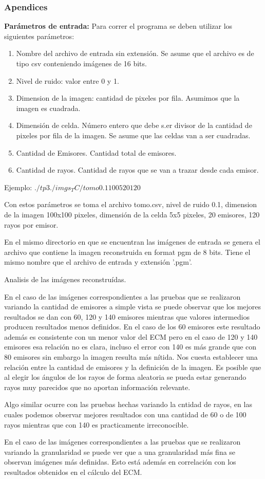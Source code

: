 \subsubsection*{Apendices}

\textbf{Parámetros de entrada:} Para correr el programa se deben utilizar los siguientes parámetros:
\begin{enumerate}
\item Nombre del archivo de entrada sin extensión. Se asume que el archivo es de tipo csv conteniendo imágenes de 16 bits.
\item Nivel de ruido: valor entre 0 y 1.
\item Dimension de la imagen: cantidad de pixeles por fila. Asumimos que la imagen es cuadrada.
\item Dimensión de celda. Número entero que debe s.er divisor de la cantidad de pixeles por fila de la imagen. Se asume que las celdas van a ser cuadradas.
\item Cantidad de Emisores. Cantidad total de emisores.
\item Cantidad de rayos. Cantidad de rayos que se van a trazar desde cada emisor.
\end{enumerate}
\par Ejemplo: $./tp3 ./imgs_TC/tomo 0.1 100 5 20 120$
\par Con estos parámetros se toma el archivo tomo.csv, nivel de ruido 0.1, dimension de la imagen 100x100 pixeles, dimensión de la celda 5x5 pixeles, 20 emisores, 120 rayos por emisor.

\par En el mismo directorio en que se encuentran las imágenes de entrada se genera el archivo que contiene la imagen reconstruida en format pgm de 8 bits. Tiene el mismo nombre que el archivo de entrada y extensión '.pgm'.

Analisis de las imágenes reconstruídas.

En el caso de las imágenes correspondientes a las pruebas que se realizaron variando la cantidad de emisores a simple vista se puede observar que los mejores resultados se dan con 60, 120 y 140 emisores mientras que valores intermedios producen resultados menos definidos. En el caso de los 60 emisores este resultado además es consistente con un menor valor del ECM pero en el caso de 120 y 140 emisores esa relación no es clara, incluso el error con 140 es más grande que con 80 emisores sin embargo la imagen resulta más nítida. Nos cuesta establecer una relación entre la cantidad de emisores y la definición de la imagen. Es posible que al elegir los ángulos de los rayos de forma aleatoria se pueda estar generando rayos muy parecidos que no aportan información relevante.

Algo similar ocurre con las pruebas hechas variando la cntidad de rayos, en las cuales podemos observar mejores resultados con una cantidad de 60 o de 100 rayos mientras que con 140 es practicamente irreconocible.

En el caso de las imágenes correspondientes a las pruebas que se realizaron variando la granularidad se puede ver que a una granularidad más fina se observan imágenes más definidas. Esto está además en correlación con los resultados obtenidos en el cálculo del ECM.
